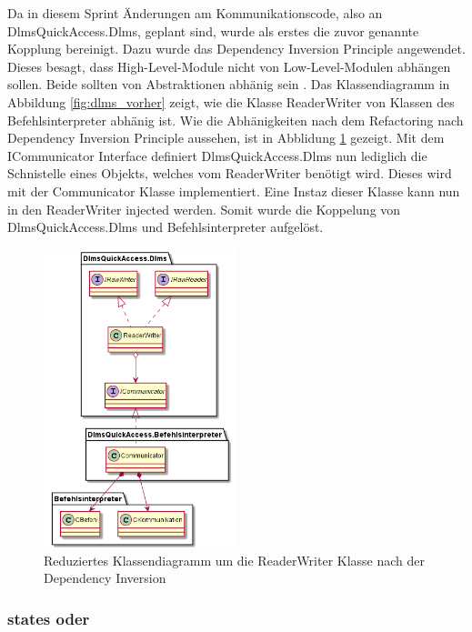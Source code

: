 Da in diesem Sprint Änderungen am Kommunikationscode, also an DlmsQuickAccess.Dlms, geplant sind, wurde als erstes die zuvor genannte Kopplung bereinigt.
Dazu wurde das Dependency Inversion Principle angewendet.
Dieses besagt, dass High-Level-Module nicht von Low-Level-Modulen abhängen sollen.
Beide sollten von Abstraktionen abhänig sein \parencite{madasu35solid}.
Das Klassendiagramm in Abbildung \ref{fig:dlms_vorher} zeigt, wie die Klasse ReaderWriter von Klassen des Befehlsinterpreter abhänig ist.
Wie die Abhänigkeiten nach dem Refactoring nach Dependency Inversion Principle aussehen, ist in Abblidung \ref{fig:dlms_nachher} gezeigt.
Mit dem ICommunicator Interface definiert DlmsQuickAccess.Dlms nun lediglich die Schnistelle eines Objekts, welches vom ReaderWriter benötigt wird.
Dieses wird mit der Communicator Klasse implementiert. Eine Instaz dieser Klasse kann nun in den ReaderWriter injected werden.
Somit wurde die Koppelung von DlmsQuickAccess.Dlms und Befehlsinterpreter aufgelöst.




\begin{figure}[H]
   \centering
   \includegraphics[width=0.5\textwidth]{gfx/dlms_nachher.png}
   \caption{
      Reduziertes Klassendiagramm um die ReaderWriter Klasse nach der Dependency Inversion
   }
   \label{fig:dlms_nachher}
\end{figure}

\subsubsection{states oder}

